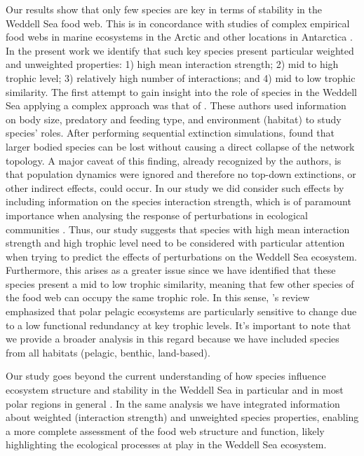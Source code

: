 \documentclass[gc, manuscript]{copernicus}
\begin{document}
Our results show that only few species are key in terms of stability in
the Weddell Sea food web. This is in concordance with studies of complex
empirical food webs in marine ecosystems in the Arctic and other
locations in Antarctica \citep{Kortsch2015, Marina2018, Rodriguez2022}.
In the present work we identify that such key species present particular
weighted and unweighted properties: 1) high mean interaction strength;
2) mid to high trophic level; 3) relatively high number of interactions;
and 4) mid to low trophic similarity. The first attempt to gain insight
into the role of species in the Weddell Sea applying a complex approach
was that of \citet{Jacob2011}. These authors used information on body
size, predatory and feeding type, and environment (habitat) to study
species' roles. After performing sequential extinction simulations,
\citet{Jacob2011} found that larger bodied species can be lost without
causing a direct collapse of the network topology. A major caveat of
this finding, already recognized by the authors, is that population
dynamics were ignored and therefore no top-down extinctions, or other
indirect effects, could occur. In our study we did consider such effects
by including information on the species interaction strength, which is
of paramount importance when analysing the response of perturbations in
ecological communities \citep{McCann1998, Montoya2009, Novak2011}. Thus,
our study suggests that species with high mean interaction strength and
high trophic level need to be considered with particular attention when
trying to predict the effects of perturbations on the Weddell Sea
ecosystem. Furthermore, this arises as a greater issue since we have
identified that these species present a mid to low trophic similarity,
meaning that few other species of the food web can occupy the same
trophic role. In this sense, \citet{Murphy2016}'s review emphasized that
polar pelagic ecosystems are particularly sensitive to change due to a
low functional redundancy at key trophic levels. It's important to note
that we provide a broader analysis in this regard because we have
included species from all habitats (pelagic, benthic, land-based).

\clearpage
\conclusions[Conclusions]

Our study goes beyond the current understanding of how species influence
ecosystem structure and stability in the Weddell Sea in particular and
in most polar regions in general \citep{Murphy2016, McCormack2021}. In
the same analysis we have integrated information about weighted
(interaction strength) and unweighted species properties, enabling a
more complete assessment of the food web structure and function, likely
highlighting the ecological processes at play in the Weddell Sea
ecosystem.
\end{document}
